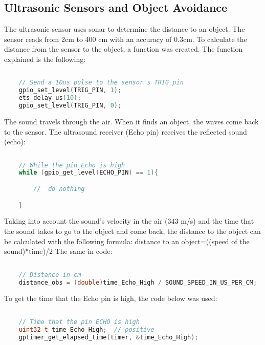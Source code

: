 \documentclass[../report.tex]{subfiles}
\begin{document}
\subsection{Ultrasonic Sensors and Object Avoidance}
The ultrasonic sensor uses sonar to determine the distance to an object. 
The sensor reads from 2cm to 400 cm with an accuracy of 0.3cm. To calculate
 the distance from the sensor to the object, a function was created. 
 The function explained is the following:

 \begin{lstlisting}[language=c,caption={The TRIG pin's Code},label={code:ultrasonic}]
    
    // Send a 10us pulse to the sensor's TRIG pin
    gpio_set_level(TRIG_PIN, 1);
    ets_delay_us(10);
    gpio_set_level(TRIG_PIN, 0);

\end{lstlisting}

The sound travels through the air. When it finds an object, 
the waves come back to the sensor. 
The ultrasound receiver (Echo pin) receives the reflected sound (echo):

\begin{lstlisting}[language=c,caption={The ECHO pin's Code},label={code:ultrasonic}]
    
    // While the pin Echo is high
    while (gpio_get_level(ECHO_PIN) == 1){

        //  do nothing

    }

\end{lstlisting}

Taking into account the sound’s velocity in the air (343 m/s) and the 
time that the sound takes to go to the object and come back, the distance
 to the object can be calculated with the following formula:
distance to an object=((speed of the sound)*time)/2
The same in code:

\begin{lstlisting}[language=c,caption={The distance's Code},label={code:ultrasonic}]
    
    // Distance in cm
    distance_obs = (double)time_Echo_High / SOUND_SPEED_IN_US_PER_CM;


\end{lstlisting}

To get the time that the Echo pin is high, the code below was used:

\begin{lstlisting}[language=c,caption={code to get the time that ECHO is high},label={code:ultrasonic}]
    
    // Time that the pin ECHO is high 
    uint32_t time_Echo_High;  // positive
    gptimer_get_elapsed_time(timer, &time_Echo_High);


\end{lstlisting}
\end{document}
